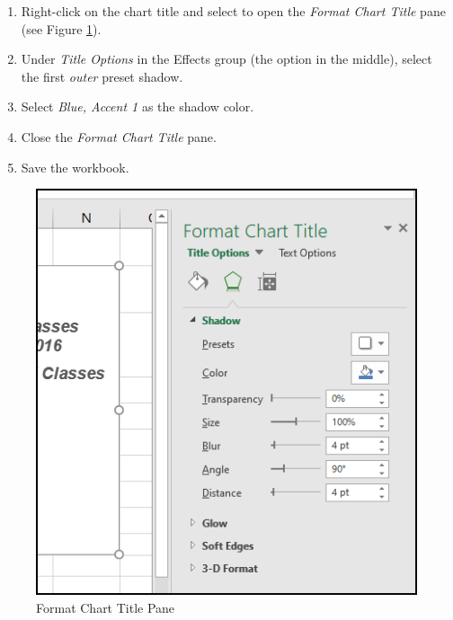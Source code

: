 \begin{enumbox}
\begin{enumerate}
		\item Right-click on the chart title and select  to open the \textit{Format Chart Title} pane (see Figure \ref{04:fig33}).
		\item Under \textit{Title Options} in the Effects group (the option in the middle), select the first \textit{outer} preset shadow. 
		\item Select \textit{Blue, Accent 1} as the shadow color.
		\item Close the \textit{Format Chart Title} pane.
		\item Save the  workbook.
	\end{enumerate}
\end{enumbox}
	
\begin{figure}[H]
	\centering
	\includegraphics[width=\maxwidth{.75\linewidth}]{gfx/ch04_fig33}
	\caption{Format Chart Title Pane}
	\label{04:fig33}
\end{figure}

